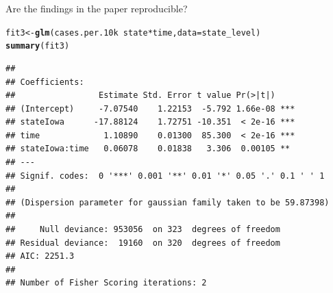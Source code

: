\documentclass[10pt]{beamer}\usepackage[]{graphicx}\usepackage[]{color}
\makeatletter
\def\maxwidth{ %
  \ifdim\Gin@nat@width>\linewidth
    \linewidth
  \else
    \Gin@nat@width
  \fi
}
\newcommand{\hlstr}[1]{\textcolor[rgb]{0.192,0.494,0.8}{#1}}%
\newcommand{\hlopt}[1]{\textcolor[rgb]{0,0,0}{#1}}%
\newcommand{\hlstd}[1]{\textcolor[rgb]{0.345,0.345,0.345}{#1}}%
\newcommand{\hlkwb}[1]{\textcolor[rgb]{0.69,0.353,0.396}{#1}}%
\newcommand{\hlkwc}[1]{\textcolor[rgb]{0.333,0.667,0.333}{#1}}%
\newcommand{\hlkwd}[1]{\textcolor[rgb]{0.737,0.353,0.396}{\textbf{#1}}}%
\newenvironment{kframe}{%
 \def\at@end@of@kframe{}%
 \ifinner\ifhmode%
  \def\at@end@of@kframe{\end{minipage}}%
  \begin{minipage}{\columnwidth}%
 \fi\fi%
 \def\FrameCommand##1{\hskip\@totalleftmargin \hskip-\fboxsep
 \colorbox{shadecolor}{##1}\hskip-\fboxsep
     \hskip-\linewidth \hskip-\@totalleftmargin \hskip\columnwidth}%
 \MakeFramed {\advance\hsize-\width
   \@totalleftmargin\z@ \linewidth\hsize
   \@setminipage}}%
 {\par\unskip\endMakeFramed%
 \at@end@of@kframe}
\newenvironment{knitrout}{}{} %
\makeatother
\begin{document}
\begin{frame}[fragile]{Are the findings in the paper reproducible?}
	
\begin{knitrout}\tiny
{}\color{fgcolor}\begin{kframe}
\begin{alltt}
\hlstd{fit3} \hlkwb{<-} \hlkwd{glm}\hlstd{(cases.per.10k} \hlopt{~} \hlstd{state}\hlopt{*}\hlstd{time,} \hlkwc{data} \hlstd{= state_level)}
\hlkwd{summary}\hlstd{(fit3)}
\end{alltt}
\begin{verbatim}
## 
## Coefficients:
##                 Estimate Std. Error t value Pr(>|t|)    
## (Intercept)     -7.07540    1.22153  -5.792 1.66e-08 ***
## stateIowa      -17.88124    1.72751 -10.351  < 2e-16 ***
## time             1.10890    0.01300  85.300  < 2e-16 ***
## stateIowa:time   0.06078    0.01838   3.306  0.00105 ** 
## ---
## Signif. codes:  0 '***' 0.001 '**' 0.01 '*' 0.05 '.' 0.1 ' ' 1
## 
## (Dispersion parameter for gaussian family taken to be 59.87398)
## 
##     Null deviance: 953056  on 323  degrees of freedom
## Residual deviance:  19160  on 320  degrees of freedom
## AIC: 2251.3
## 
## Number of Fisher Scoring iterations: 2
\end{verbatim}
\end{kframe}
\end{knitrout}
	
\end{frame}


\end{document}
